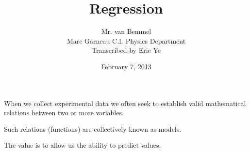 \documentclass[letterpaper, 12pt]{article}
\begin{document}
\title{Regression}
\author{Mr. van Bemmel\\
Marc Garneau C.I. Physics Department\\
Transcribed by Eric Ye}
\renewcommand{\today}{February 7, 2013}
\date{\today}
\maketitle

When we collect experimental data we often seek to establish valid mathematical relations between two or more variables.

Such relations (functions) are collectively known as models.

The value is to allow us the ability to predict values.
\end{document}
